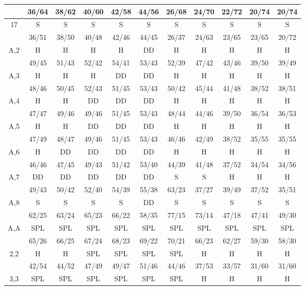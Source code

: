 \documentclass{article}
\begin{document}
\begin{small}
\begin{tabular}{c|c|c|c|c|c|c|c|c|c|c|}
 & 36/64  & 38/62  & 40/60  & 42/58  & 44/56  & 26/68  & 24/70  & 22/72  & 20/74  & 20/74 \\
\hline
17  & S  & S  & S  & S  & S  & S  & S  & S  & S  & S \\
 & 36/51  & 38/50  & 40/48  & 42/46  & 44/45  & 26/37  & 24/63  & 23/65  & 23/65  & 20/72 \\
\hline
A,2  & H  & H  & H  & H  & DD  & H  & H  & H  & H  & H \\
 & 49/45  & 51/43  & 52/42  & 54/41  & 53/43  & 52/39  & 47/42  & 43/46  & 39/50  & 39/49 \\
\hline
A,3  & H  & H  & H  & DD  & DD  & H  & H  & H  & H  & H \\
 & 48/46  & 50/45  & 52/43  & 51/45  & 53/43  & 50/42  & 45/44  & 41/48  & 38/52  & 38/51 \\
\hline
A,4  & H  & H  & DD  & DD  & DD  & H  & H  & H  & H  & H \\
 & 47/47  & 49/46  & 49/46  & 51/45  & 53/43  & 48/44  & 44/46  & 39/50  & 36/54  & 36/53 \\
\hline
A,5  & H  & H  & DD  & DD  & DD  & H  & H  & H  & H  & H \\
 & 47/49  & 48/47  & 49/46  & 51/45  & 53/43  & 46/46  & 42/49  & 38/52  & 35/55  & 35/55 \\
\hline
A,6  & H  & DD  & DD  & DD  & DD  & H  & H  & H  & H  & H \\
 & 46/46  & 47/45  & 49/43  & 51/42  & 53/40  & 44/39  & 41/48  & 37/52  & 34/54  & 34/56 \\
\hline
A,7  & DD  & DD  & DD  & DD  & DD  & S  & S  & H  & H  & H \\
 & 49/43  & 50/42  & 52/40  & 54/39  & 55/38  & 63/23  & 37/27  & 39/49  & 37/52  & 35/51 \\
\hline
A,8  & S  & S  & S  & S  & DD  & S  & S  & S  & S  & S \\
 & 62/25  & 63/24  & 65/23  & 66/22  & 58/35  & 77/15  & 73/14  & 47/18  & 47/41  & 49/30 \\
\hline
A,A  & SPL  & SPL  & SPL  & SPL  & SPL  & SPL  & SPL  & SPL  & SPL  & SPL \\
 & 65/26  & 66/25  & 67/24  & 68/23  & 69/22  & 70/21  & 66/23  & 62/27  & 59/30  & 58/30 \\
\hline
2,2  & H  & H  & SPL  & SPL  & SPL  & SPL  & H  & H  & H  & H \\
 & 42/54  & 44/52  & 47/49  & 49/47  & 51/46  & 44/46  & 37/53  & 33/57  & 31/60  & 31/60 \\
\hline
3,3  & SPL  & SPL  & SPL  & SPL  & SPL  & SPL  & H  & H  & H  & H \\

\end{tabular}
\end{small}
\end{document}
